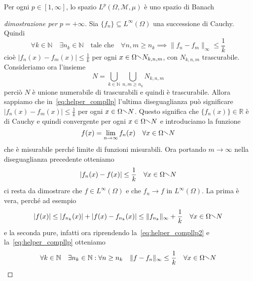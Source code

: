 \begin{theorem}[\(L^p\) è Banach ]\label{thm:completezza_Lp}
    Per ogni \(p \in [1, \infty]\), lo spazio \(L^{p}(\Omega, \mathcal{M},
    \mu)\) è uno spazio di Banach
\end{theorem}
\begin{proof}[dimostrazione per \(p=+\infty\)]
    Sia \(\{f_{n}\} \subseteq L^{\infty}{(\Omega)} \) una successione di Cauchy.
    Quindi 
    \begin{equation}\label{eq:helper_compllp}
        \forall k \in \mathbb{N} \quad \exists n_k \in \mathbb{N} \quad
        \text{tale che} \quad \forall n, m \ge n_k \implies \|f_{n} -
        f_{m}\|_\infty \le  \frac{1}{k}
    \end{equation}
    cioè \(|f_{n}{(x)} - f_{m}{(x)}| \le \frac{1}{k}\) per ogni \(x \in \Omega
    \sminus N_{k, n, m} \), con \(N_{k, n, m} \) trascurabile. Consideriamo ora
    l'insieme
    \[
        N = \bigcup_{k \in \mathbb{N}} \bigcup_{n, m \ge n_k} N_{k, n, m}
    \]
    perciò \(N\) è unione numerabile di trascurabili e quindi è trascurabile.
    Allora sappiamo che in~\eqref{eq:helper_compllp} l'ultima diseguaglianza può
    significare \(|f_{n}{(x)} - f_{m}{(x)}| \le \frac{1}{k}\) per ogni \(x \in
    \Omega \sminus N\).
    Questo significa che \(\{f_{n}{(x)}\} \in \mathbb{R}\) è di Cauchy e quindi
    convergente per ogni \(x \in \Omega \sminus N\) e introduciamo la funzione
    \[
        f(x) = \lim_{n\to \infty} f_{n}{(x)} \quad \forall x \in \Omega \sminus N
    \]
    che è misurabile perché limite di funzioni misurabili. Ora portando \(m \to
    \infty\) nella diseguaglianza precedente otteniamo
    \begin{equation}\label{eq:helper_compllp2}
        |f_{n}{(x)} - f{(x)}| \le \frac{1}{k} \quad \forall x \in \Omega \sminus N
    \end{equation}
    ci resta da dimostrare che \(f \in L^{\infty}(\Omega)\) e che \(f_{n} \to
    f\) in \(L^{\infty}{(\Omega)}\). La prima è vera, perché ad esempio
    \[
        |f{(x)}| \le |f_{n_k}{(x)}| + |f{(x)} - f_{n_k} {(x)}| \le \|f_{n_k}\|_\infty +
        \frac{1}{k} \quad \forall x \in \Omega \sminus N
    \]
    e la seconda pure, infatti ora riprendendo la~\eqref{eq:helper_compllp2} e
    la~\eqref{eq:helper_compllp} otteniamo
    \[
        \forall k \in \mathbb{N} \quad \exists n_k \in \mathbb{N} : \forall n
        \ge n_k \quad \|f - f_{n}\|_\infty \le \frac{1}{k} \quad \forall x \in \Omega \sminus N
    \]
    
\end{proof}
